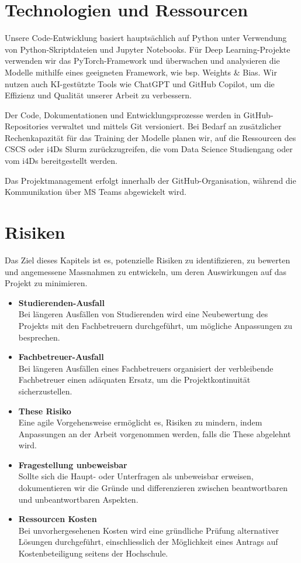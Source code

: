 \section{Technologien und Ressourcen}
Unsere Code-Entwicklung basiert hauptsächlich auf Python unter Verwendung von Python-Skriptdateien und Jupyter Notebooks. Für Deep Learning-Projekte verwenden wir das PyTorch-Framework und überwachen und analysieren die Modelle mithilfe eines geeigneten Framework, wie bsp. Weights \& Bias. Wir nutzen auch KI-gestützte Tools wie ChatGPT und GitHub Copilot, um die Effizienz und Qualität unserer Arbeit zu verbessern.

Der Code, Dokumentationen und Entwicklungsprozesse werden in GitHub-Repositories verwaltet und mittels Git versioniert. Bei Bedarf an zusätzlicher Rechenkapazität für das Training der Modelle planen wir, auf die Ressourcen des CSCS oder i4Ds Slurm zurückzugreifen, die vom Data Science Studiengang oder vom i4Ds bereitgestellt werden.

Das Projektmanagement erfolgt innerhalb der GitHub-Organisation, während die Kommunikation über MS Teams abgewickelt wird.

\section{Risiken}
Das Ziel dieses Kapitels ist es, potenzielle Risiken zu identifizieren, zu bewerten und angemessene Massnahmen zu entwickeln, um deren Auswirkungen auf das Projekt zu minimieren.

\begin{itemize}
    \item \textbf{Studierenden-Ausfall} \\
    Bei längeren Ausfällen von Studierenden wird eine Neubewertung des Projekts mit den Fachbetreuern durchgeführt, um mögliche Anpassungen zu besprechen.
    
    \item \textbf{Fachbetreuer-Ausfall} \\
    Bei längeren Ausfällen eines Fachbetreuers organisiert der verbleibende Fachbetreuer einen adäquaten Ersatz, um die Projektkontinuität sicherzustellen.
    
    \item \textbf{These Risiko} \\
    Eine agile Vorgehensweise ermöglicht es, Risiken zu mindern, indem Anpassungen an der Arbeit vorgenommen werden, falls die These abgelehnt wird.

    \item \textbf{Fragestellung unbeweisbar} \\
    Sollte sich die Haupt- oder Unterfragen als unbeweisbar erweisen, dokumentieren wir die Gründe und differenzieren zwischen beantwortbaren und unbeantwortbaren Aspekten.

    \item \textbf{Ressourcen Kosten} \\
    Bei unvorhergesehenen Kosten wird eine gründliche Prüfung alternativer Lösungen durchgeführt, einschliesslich der Möglichkeit eines Antrags auf Kostenbeteiligung seitens der Hochschule.
    
\end{itemize}

